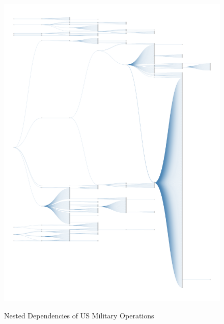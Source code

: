 \documentclass[fleqn,12pt]{article}
\begin{document}
\clearpage
{}
\newpage
\begin{figure}[h]
	\begin{center}
		\caption{Nested Dependencies of US Military Operations}
		{\includegraphics[height = \textheight]{paper/figures/fig-dendrogram-1.png}}
		\label{fig:fig-dendrogram-1}
		\vspace{0.1 in}
	\end{center}
\end{figure}
\end{document}
